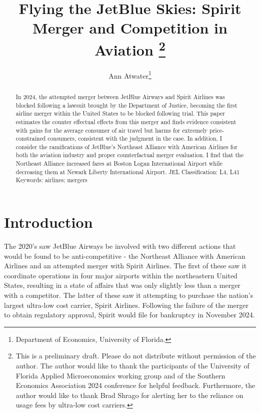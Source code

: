\documentclass{article}
\author{Ann Atwater\footnote{Department of Economics, University of Florida.}}
\title{Flying the JetBlue Skies: Spirit Merger and Competition in Aviation \footnote{This is a preliminary draft. Please do not distribute without permission of the author. The author would like to thank the participants of the University of Florida Applied Microeconomics working group and of the Southern Economics Association 2024 conference for helpful feedback. Furthermore, the author would like to thank Brad Shrago for alerting her to the reliance on usage fees by ultra-low cost carriers. }}
\begin{document}
	\maketitle
	
	\begin{abstract}
In 2024, the attempted merger between JetBlue Airways and Spirit Airlines was blocked following a lawsuit brought by the Department of Justice, becoming the first airline merger within the United States to be blocked following trial. This paper estimates the counter effectual effects from this merger and finds evidence consistent with gains for the average consumer of air travel but harms for extremely price-constrained consumers, consistent with the judgment in the case. In addition, I consider the ramifications of JetBlue's Northeast Alliance with American Airlines for both the aviation industry and proper counterfactual merger evaluation. I find that the Northeast Alliance increased fares at Boston Logan International Airport while decreasing them at Newark Liberty International Airport. \bigskip
	\noindent JEL Classification: L4, L41 \newline
	\noindent Keywords: airlines; mergers
		
	\end{abstract}
	
	\pagebreak
	
	\doublespacing
	
	\section{Introduction}
	\label{sec:Introduction}
    The 2020's saw JetBlue Airways be involved with two different actions that would be found to be anti-competitive - the Northeast Alliance with American Airlines and an attempted merger with Spirit Airlines. The first of these saw it coordinate operations in four major airports within the northeastern United States, resulting in a state of affairs that was only slightly less than a merger with a competitor. The latter of these saw it attempting to purchase the nation's largest ultra-low cost carrier, Spirit Airlines. Following the failure of the merger to obtain regulatory approval, Spirit would file for bankruptcy in November 2024. 
	
\end{document}
